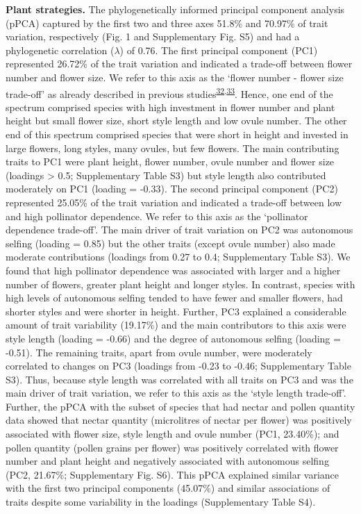 \documentclass[12pt,a4paper,]{article}
\begin{document}
\textbf{Plant strategies.} The phylogenetically informed principal
component analysis (pPCA) captured by the first two and three axes
51.8\% and 70.97\% of trait variation, respectively (Fig. 1 and
Supplementary Fig. S5) and had a phylogenetic correlation (\(\lambda\))
of 0.76. The first principal component (PC1) represented 26.72\% of the
trait variation and indicated a trade-off between flower number and
flower size. We refer to this axis as the `flower number - flower size
trade-off' as already described in previous
studies\textsuperscript{\protect\hyperlink{ref-sargent2007}{32},\protect\hyperlink{ref-kettle2011}{33}}.
Hence, one end of the spectrum comprised species with high investment in
flower number and plant height but small flower size, short style length
and low ovule number. The other end of this spectrum comprised species
that were short in height and invested in large flowers, long styles,
many ovules, but few flowers. The main contributing traits to PC1 were
plant height, flower number, ovule number and flower size (loadings
\textgreater{} \textbar{}0.5\textbar{}; Supplementary Table S3) but
style length also contributed moderately on PC1 (loading = -0.33). The
second principal component (PC2) represented 25.05\% of the trait
variation and indicated a trade-off between low and high pollinator
dependence. We refer to this axis as the `pollinator dependence
trade-off'. The main driver of trait variation on PC2 was autonomous
selfing (loading = 0.85) but the other traits (except ovule number) also
made moderate contributions (loadings from 0.27 to 0.4; Supplementary
Table S3). We found that high pollinator dependence was associated with
larger and a higher number of flowers, greater plant height and longer
styles. In contrast, species with high levels of autonomous selfing
tended to have fewer and smaller flowers, had shorter styles and were
shorter in height. Further, PC3 explained a considerable amount of trait
variability (19.17\%) and the main contributors to this axis were style
length (loading = -0.66) and the degree of autonomous selfing (loading =
-0.51). The remaining traits, apart from ovule number, were moderately
correlated to changes on PC3 (loadings from -0.23 to -0.46;
Supplementary Table S3). Thus, because style length was correlated with
all traits on PC3 and was the main driver of trait variation, we refer
to this axis as the `style length trade-off'. Further, the pPCA with the
subset of species that had nectar and pollen quantity data showed that
nectar quantity (microlitres of nectar per flower) was positively
associated with flower size, style length and ovule number (PC1,
23.40\%); and pollen quantity (pollen grains per flower) was positively
correlated with flower number and plant height and negatively associated
with autonomous selfing (PC2, 21.67\%; Supplementary Fig. S6). This pPCA
explained similar variance with the first two principal components
(45.07\%) and similar associations of traits despite some variability in
the loadings (Supplementary Table S4).
\end{document}
